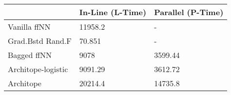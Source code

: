 \begin{tabular}{lll}
\toprule
{} & In-Line (L-Time) & Parallel (P-Time) \\
\midrule
Vanilla ffNN       &          11958.2 &                 - \\
Grad.Bstd Rand.F   &           70.851 &                 - \\
Bagged ffNN        &             9078 &           3599.44 \\
Architope-logistic &          9091.29 &           3612.72 \\
Architope          &          20214.4 &           14735.8 \\
\bottomrule
\end{tabular}

